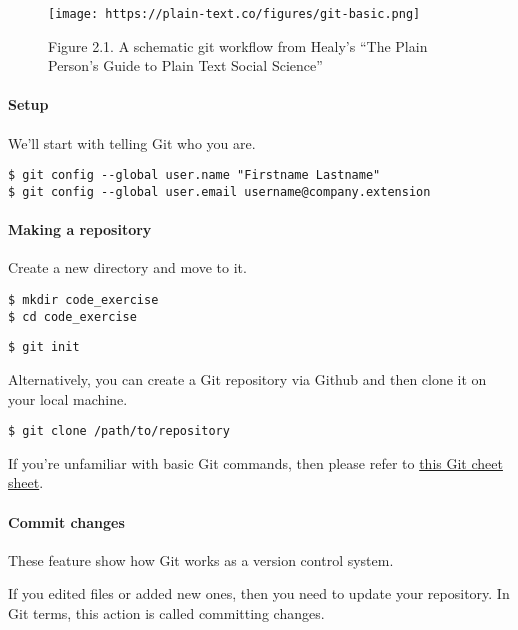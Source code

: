 \documentclass[
]{book}
\begin{document}
\begin{figure}
\centering
\texttt{[image: https://plain-text.co/figures/git-basic.png]}
\caption{Figure 2.1. A schematic git workflow from Healy's ``The Plain Person's Guide to Plain Text Social Science''}
\end{figure}

\hypertarget{setup-1}{%
\paragraph{Setup}\label{setup-1}}

We'll start with telling Git who you are.

\begin{verbatim}
$ git config --global user.name "Firstname Lastname"
$ git config --global user.email username@company.extension
\end{verbatim}

\hypertarget{making-a-repository}{%
\paragraph{Making a repository}\label{making-a-repository}}

Create a new directory and move to it.

\begin{verbatim}
$ mkdir code_exercise 
$ cd code_exercise 
\end{verbatim}

\begin{verbatim}
$ git init 
\end{verbatim}

Alternatively, you can create a Git repository via Github and then clone it on your local machine.

\begin{verbatim}
$ git clone /path/to/repository
\end{verbatim}

If you're unfamiliar with basic Git commands, then please refer to \href{http://rogerdudler.github.io/git-guide/files/git_cheat_sheet.pdf}{this Git cheet sheet}.

\hypertarget{commit-changes}{%
\paragraph{Commit changes}\label{commit-changes}}

These feature show how Git works as a version control system.

If you edited files or added new ones, then you need to update your repository. In Git terms, this action is called committing changes.
\end{document}
